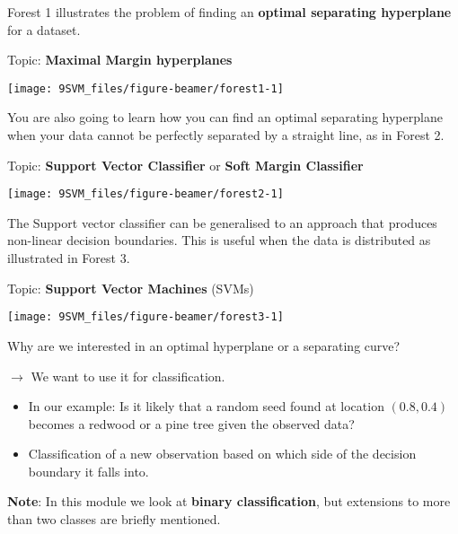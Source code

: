 \documentclass[10pt,ignorenonframetext,]{beamer}
\begin{document}
\begin{frame}

Forest 1 illustrates the problem of finding an \textbf{optimal
separating hyperplane} for a dataset.

Topic: \textbf{Maximal Margin hyperplanes}

\begin{center}\texttt{[image: 9SVM\_files/figure-beamer/forest1-1]} \end{center}

\end{frame}

\begin{frame}

You are also going to learn how you can find an optimal separating
hyperplane when your data cannot be perfectly separated by a straight
line, as in Forest 2.

Topic: \textbf{Support Vector Classifier} or \textbf{Soft Margin
Classifier}

\begin{center}\texttt{[image: 9SVM\_files/figure-beamer/forest2-1]} \end{center}

\end{frame}

\begin{frame}

The Support vector classifier can be generalised to an approach that
produces non-linear decision boundaries. This is useful when the data is
distributed as illustrated in Forest 3.

Topic: \textbf{Support Vector Machines} (SVMs)

\begin{center}\texttt{[image: 9SVM\_files/figure-beamer/forest3-1]} \end{center}

\end{frame}

\begin{frame}

Why are we interested in an optimal hyperplane or a separating curve?

\(\rightarrow\) We want to use it for classification.

\begin{itemize}
\item
  In our example: Is it likely that a random seed found at location
  \((0.8,0.4)\) becomes a redwood or a pine tree given the observed
  data?
\item
  Classification of a new observation based on which side of the
  decision boundary it falls into.
\end{itemize}

\vspace{2mm}

\textbf{Note}: In this module we look at \textbf{binary classification},
but extensions to more than two classes are briefly mentioned.

\end{frame}
\end{document}
